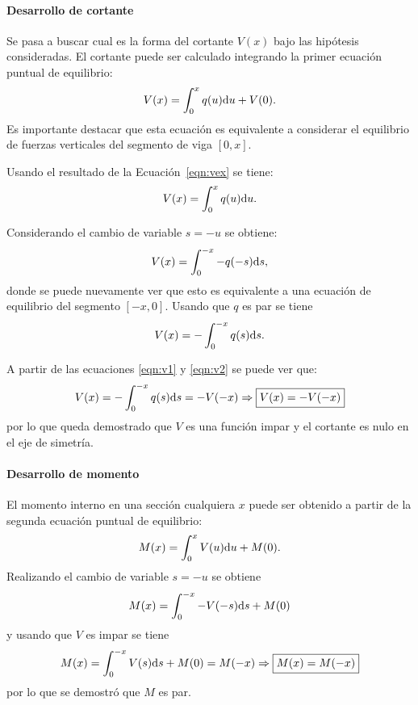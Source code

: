 

\paragraph{Desarrollo de cortante}
Se pasa a buscar cual es la forma del cortante $V(x)$ bajo las hipótesis consideradas. %
%
El cortante puede ser calculado integrando la primer ecuación puntual de equilibrio:
%
\begin{equation}
V(x) = \int_{0}^{x} q(u) {\text{d}} u + V(0).
\end{equation}
%
Es importante destacar que esta ecuación es equivalente a considerar el equilibrio de fuerzas verticales del segmento de viga $[0,x]$.


Usando el resultado de la Ecuación~\eqref{eqn:vex} se tiene:
\begin{equation}\label{eqn:v1}
V(x) = \int_{0}^{x} q(u) {\text{d}} u.
\end{equation}

Considerando el cambio de variable $s=-u$ se obtiene:
%
\begin{equation}
V(x) = \int_{0}^{-x} -q(-s) {\text{d}} s,
\end{equation}
%
donde se puede nuevamente ver que esto es equivalente a una ecuación de equilibrio del segmento $[-x,0]$. %
Usando que $q$ es par se tiene
\begin{equation}\label{eqn:v2}
V(x) = - \int_{0}^{-x} q(s) {\text{d}} s.
\end{equation}
%


A partir de las ecuaciones \eqref{eqn:v1} y \eqref{eqn:v2} se puede ver que:
%
\begin{equation}
V(x) = - \int_{0}^{-x} q(s) {\text{d}} s  = -V(-x)
\Rightarrow \boxed{
V(x) = -V(-x)}
\end{equation}
%
por lo que queda demostrado que $V$ es una función impar y el cortante es nulo en el eje de simetría.


\paragraph{Desarrollo de momento}
El momento interno en una sección cualquiera $x$ puede ser obtenido  a partir de la segunda ecuación puntual de equilibrio:
%
\begin{equation}
M(x) = \int_{0}^{x} V(u) {\text{d}} u + M(0).
\end{equation}
%
Realizando el cambio de variable $s=-u$ se obtiene
\begin{equation}
M(x) = \int_{0}^{-x} -V(-s) {\text{d}} s + M(0)
\end{equation}
%
y usando que $V$ es impar se tiene
\begin{equation}
M(x) = \int_{0}^{-x} V(s) {\text{d}} s + M(0) = M(-x)
\Rightarrow \boxed{
M(x) = M(-x)
}
\end{equation}
por lo que se demostró que $M$ es par.

